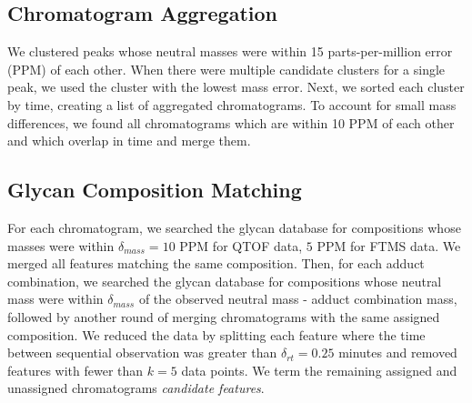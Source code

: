 \subsection{Chromatogram Aggregation}
    We clustered peaks whose neutral masses were within 15 parts-per-million error
    (PPM) of each other. When there were multiple candidate clusters for a single peak,
    we used the cluster with the lowest mass error. Next, we sorted each cluster by time,
    creating a list of aggregated chromatograms. To account for small mass differences,
    we found all chromatograms which are within 10 PPM of each other and which overlap
    in time and merge them.

\subsection{Glycan Composition Matching}
    For each chromatogram, we searched the glycan database for compositions
    whose masses were within $\delta_{mass} = 10$ PPM for QTOF data, $5$ PPM
    for FTMS data. We merged all features matching the same composition. Then, for
    each adduct combination, we searched the glycan database for compositions
    whose neutral mass were within $\delta_{mass}$ of the observed neutral mass - adduct
    combination mass, followed by another round of merging chromatograms with the same
    assigned composition. We reduced the data by splitting each feature where the time
    between sequential observation was greater than $\delta_{rt} = 0.25$ minutes and
    removed features with fewer than $k = 5$ data points.%
    We term the remaining assigned and unassigned chromatograms \textit{candidate features}.
